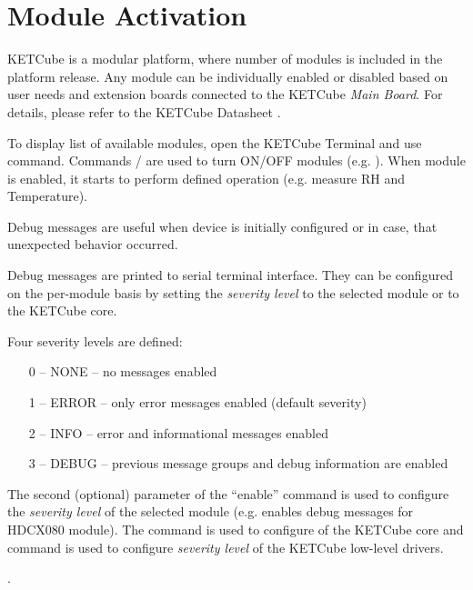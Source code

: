 \clearpage 
{} 
\pagestyle{headings} 

\clearpage

\section{Module Activation}\label{sec:activation}
KETCube is a modular platform, where number of modules is included in the platform release. Any module can be individually enabled or disabled based on user needs and extension boards connected to the KETCube {\it Main Board}. For details, please refer to the KETCube Datasheet \cite{ZCU:KETCube:05-2018}.

To display list of available modules, open the KETCube Terminal and use  command. Commands / are used to turn ON/OFF modules (e.g. ). When module is enabled, it starts to perform defined operation (e.g. measure RH and Temperature).

Debug messages are useful when device is initially configured or in case, that unexpected behavior occurred.

Debug messages are printed to serial terminal interface. They can be configured on the per-module basis by setting the {\it severity level} to the selected module or to the KETCube core.

Four severity levels are defined:
\begin{itemize}
  \item[0 --] NONE -- no messages enabled
  \item[1 --] ERROR -- only error messages enabled (default severity)
  \item[2 --] INFO -- error and informational messages enabled
  \item[3 --] DEBUG -- previous message groups and debug information are enabled
\end{itemize}

The second (optional) parameter of the “enable” command is used to configure the {\it severity level} of the selected module (e.g.  enables debug messages for HDCX080 module). The command  is used to configure  of the KETCube core and command  is used to configure {\it severity level} of the KETCube low-level drivers.

.

